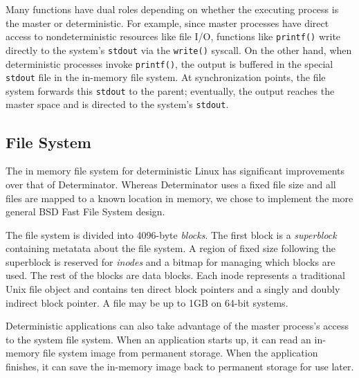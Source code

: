 Many functions have dual roles depending on whether the executing process is
the master or deterministic. For example, since master processes have direct
access to nondeterministic resources like file I/O, functions like
{\tt printf()} write directly to the system's {\tt stdout} via the {\tt write()}
syscall. On the other hand, when deterministic processes invoke {\tt printf()},
the output is buffered in the special {\tt stdout} file in the in-memory file
system. At synchronization points, the file system forwards this {\tt stdout}
to the parent; eventually, the output reaches the master space and is directed
to the system's {\tt stdout}.

\iffalse
Since master processes have direct access to the legacy Linux kernel API,
some functions server dual purposes.
Functions like {\tt printf()} are designed to access nondeterministic
(e.g. {\tt write()}) syscalls when the calling process is a
master process. Deterministic
processes use a separate version of {\tt printf()} that writes output to the
in memory file system. The file system is synced at synchronization points, and
the output is forwarded to the parent and eventually the console. At
synchronization points, parents forward {\tt stdin} input to children.
\fi

\subsection{File System} The in memory file system for deterministic Linux has
significant improvements over that of Determinator. Whereas Determinator uses a
fixed file size and all files are mapped to a known location in memory, we chose
to implement the more general BSD Fast File System design.

The file system is divided into 4096-byte \emph{blocks}. The first block is a
\emph{superblock} containing metatata about the file system. A region of fixed
size following the superblock is reserved for \emph{inodes} and a bitmap for
managing which blocks are used. The rest of the blocks are data blocks. Each
inode represents a traditional Unix file object and contains ten direct block
pointers and a singly and doubly indirect block pointer. A file may be up to
1GB on 64-bit systems.

Deterministic applications can also take advantage of the master process's
access to the system file system. When an application starts up, it can read
an in-memory file system image from permanent storage. When the application
finishes, it can save the in-memory image back to permanent storage for use
later.

\endinput

	\begin{itemize}
	\end{itemize}

